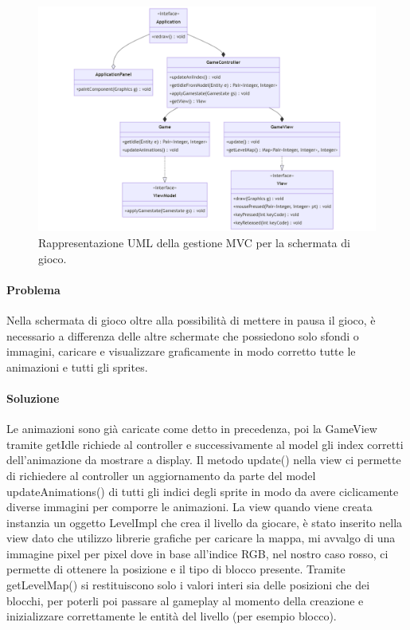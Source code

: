 \documentclass[a4paper,12pt]{report}
\begin{document}
\begin{figure}[H]
\centering{}
\includegraphics[width=\textwidth]{img/gamecontroller.png}
\caption{Rappresentazione UML della gestione MVC per la schermata di gioco.}
\end{figure}

\paragraph{Problema} Nella schermata di gioco oltre alla possibilità di mettere in pausa il gioco, è necessario a differenza delle altre schermate che possiedono solo sfondi o immagini, caricare e visualizzare graficamente in modo corretto tutte le animazioni e tutti gli sprites. 

\paragraph{Soluzione} Le animazioni sono già caricate come detto in precedenza, poi la GameView tramite getIdle richiede al controller e successivamente al model gli index corretti dell’animazione da mostrare a display. Il metodo update() nella view ci permette di richiedere al controller un aggiornamento da parte del model updateAnimations() di tutti gli indici degli sprite in modo da avere ciclicamente diverse immagini per comporre le animazioni. La view quando viene creata instanzia un oggetto LevelImpl che crea il livello da giocare, è stato inserito nella view dato che utilizzo librerie grafiche per caricare la mappa, mi avvalgo di una immagine pixel per pixel dove in base all’indice RGB, nel nostro caso rosso, ci permette di ottenere la posizione e il tipo di blocco presente. Tramite getLevelMap() si restituiscono solo i valori interi sia delle posizioni che dei blocchi, per poterli poi passare al gameplay al momento della creazione e inizializzare correttamente le entità del livello (per esempio blocco).
\end{document}
